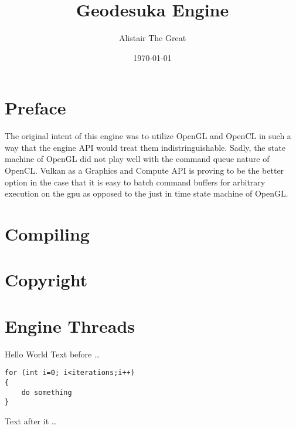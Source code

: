 \documentclass{book}
\title{Geodesuka Engine}
\author{Alistair The Great}
\date{\today}
\begin{document}
\maketitle

\tableofcontents

\frontmatter
\chapter{Preface}
The original intent of this engine was to utilize OpenGL and OpenCL in such a way that the engine API would treat them indistringuishable. Sadly, the state machine of OpenGL did not play well with the command queue nature of OpenCL. Vulkan as a Graphics and Compute API is proving to be the better option in the case that it is easy to batch command buffers for arbitrary execution on the gpu as opposed to the just in time state machine of OpenGL.
\mainmatter
\chapter{Compiling}

\chapter{Copyright}

\chapter{Engine Threads}

Hello World
Text before \dots
\begin{lstlisting}
for (int i=0; i<iterations;i++)
{
	do something
}
\end{lstlisting}
Text after it \dots
\end{document}
